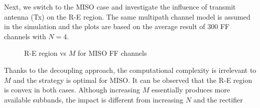 Next, we switch to the MISO case and investigate the influence of transmit antenna (Tx) on the R-E region. The same multipath channel model is assumed in the simulation and the plots are based on the average result of 300 FF channels with $N = 4$.

\begin{figure}[ht]
  \centering
  \caption{R-E region vs $M$ for MISO FF channels}
  \label{fig:re-miso}
\end{figure}

Thanks to the decoupling approach, the computational complexity is irrelevant to $M$ and the strategy is optimal for MISO. It can be observed that the R-E region is convex in both cases. Although increasing $M$ essentially produces more available subbands, the impact is different from increasing $N$ and the rectifier 